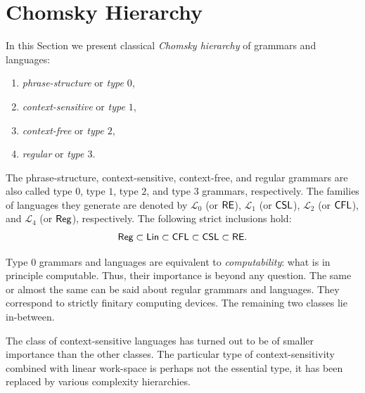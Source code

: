 \section{Chomsky Hierarchy}
\label{section:chomsky-hierarchy}

In this Section we present classical \emph{Chomsky hierarchy} of grammars and languages:

\begin{enumerate}
\item {}\emph{phrase-structure} or \emph{type $0$},
\item {}\emph{context-sensitive} or \emph{type $1$},
\item {}\emph{context-free} or \emph{type $2$},
\item {}\emph{regular} or \emph{type $3$}.
\end{enumerate}

The phrase-structure, context-sensitive, context-free, and regular grammars are also called type $0$, type $1$, type $2$, and type $3$ grammars, respectively. The families of languages they generate are denoted by 
$\mathcal{L}_0$ (or \index{$\RE$}$\RE$),
$\mathcal{L}_1$ (or \index{$\CSL$}$\CSL$), 
$\mathcal{L}_2$ (or \index{$\CFL$}$\CFL$), and 
$\mathcal{L}_4$ (or \index{$\Reg$}$\Reg$), respectively.
The following strict inclusions hold: $$\Reg \subset \Lin \subset \CFL \subset \CSL \subset \RE.$$

Type $0$ grammars and languages are equivalent to \emph{computability}: what is in principle computable. Thus, their importance is beyond any question. The same or almost the same can be said about regular grammars and languages. They correspond to strictly finitary computing devices. The remaining two classes lie in-between.

The class of context-sensitive languages has turned out to be of smaller importance than the other classes. The particular type of context-sensitivity combined with linear work-space is perhaps not the essential type, it has been replaced by various complexity hierarchies.

